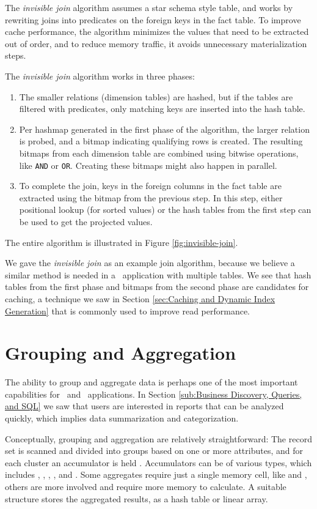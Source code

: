 The \textit{invisible join} algorithm assumes a star schema style table, and works by rewriting joins into predicates on the foreign keys in the fact table. To improve cache performance, the algorithm minimizes the values that need to be extracted out of order, and to reduce memory traffic, it avoids unnecessary materialization steps. 

The \textit{invisible join} algorithm works in three phases:
\begin{enumerate}
  \item The smaller relations (dimension tables) are hashed, but if the tables are filtered with predicates, only matching keys are inserted into the hash table.
  \item Per hashmap generated in the first phase of the algorithm, the larger relation is probed, and a bitmap indicating qualifying rows is created. The resulting bitmaps from each dimension table are combined using bitwise operations, like \texttt{AND} or \texttt{OR}. Creating these bitmaps might also happen in parallel. 
  \item To complete the join, keys in the foreign columns in the fact table are extracted using the bitmap from the previous step. In this step, either positional lookup (for sorted values) or the hash tables from the first step can be used to get the projected values.
\end{enumerate}
The entire algorithm is illustrated in Figure \ref{fig:invisible-join}.

We gave the \textit{invisible join} as an example join algorithm, because we believe a similar method is needed in a \bd~application with multiple tables. We see that hash tables from the first phase and bitmaps from the second phase are candidates for caching, a technique we saw in Section \ref{sec:Caching and Dynamic Index Generation} that is commonly used to improve read performance.

\section{Grouping and Aggregation}
\label{sec:Grouping and Aggregation}
The ability to group and aggregate data is perhaps one of the most important capabilities for \bi~and \bd~applications. In Section \ref{sub:Business Discovery, Queries, and SQL} we saw that users are interested in reports that can be analyzed quickly, which implies data summarization and categorization.

Conceptually, grouping and aggregation are relatively straightforward: The record set is scanned and divided into groups based on one or more attributes, and for each cluster an accumulator is held \cite{Bratbergsengen2015-ed}. Accumulators can be of various types, which includes , , , , and . Some aggregates require just a single memory cell, like  and , others are more involved and require more memory to calculate. A suitable structure stores the aggregated results, as a hash table or linear array. 

